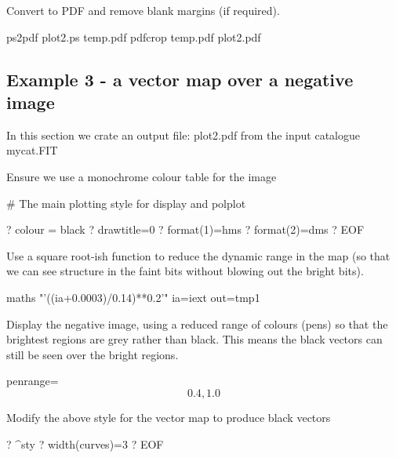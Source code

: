 Convert to PDF and remove blank margins (if required).

\begin{terminalv}
ps2pdf plot2.ps temp.pdf
pdfcrop temp.pdf plot2.pdf
\end{terminalv}

\subsection{ Example 3 - a vector map over a negative image}
\label{section:kappa-example3}


In this section we crate an output file: plot2.pdf from the input catalogue mycat.FIT

\begin{terminalv}
\end{terminalv}


Ensure we use a monochrome colour table for the image

\begin{terminalv}
\end{terminalv}


#  The main plotting style for display and polplot

\begin{terminalv}
?   colour = black
?   drawtitle=0
?   format(1)=hms
?   format(2)=dms
? EOF
\end{terminalv}


Use a square root-ish function to reduce the dynamic
range in the map (so that we can see structure in the
faint bits without blowing out the bright bits).

\begin{terminalv}
maths "'((ia+0.0003)/0.14)**0.2'" ia=iext out=tmp1
\end{terminalv}


Display the negative image, using a reduced range of colours
(pens) so that the brightest regions are grey rather than black.
This means the black vectors can still be seen over the bright
regions.

\begin{terminalv}
        penrange=\[0.4,1.0\]
\end{terminalv}


Modify the above style for the vector map to produce black vectors

\begin{terminalv}
?   ^sty
?   width(curves)=3
? EOF
\end{terminalv}


